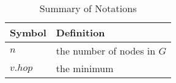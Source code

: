 \begin{table} [!h]
    \centering
    \centering \caption{Summary of Notations}
    \begin{tabular}{|p{1.5cm}|p{6.5cm}|} \hline
    Symbol &Definition
    \\ \hline
    $n$& the number of nodes in $G$
    \\ \hline
    $v.hop$& the minimum
    \\ \hline
    \end{tabular}\label{table:notation}
    
\end{table}